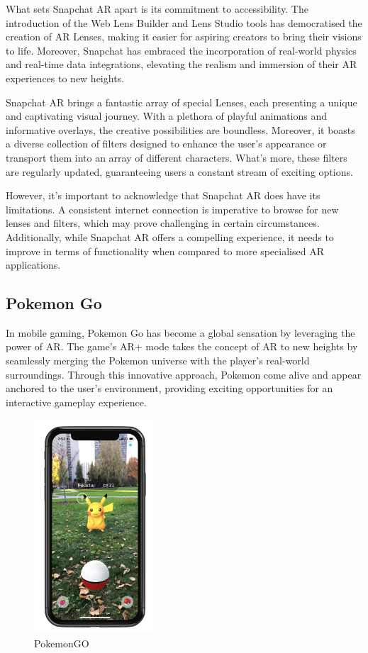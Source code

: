 What sets Snapchat \ac{AR} apart is its commitment to accessibility. The introduction of the Web Lens Builder and Lens Studio tools has democratised the creation of \ac{AR} Lenses, making it easier for aspiring creators to bring their visions to life. Moreover, Snapchat has embraced the incorporation of real-world physics and real-time data integrations, elevating the realism and immersion of their \ac{AR} experiences to new heights.

Snapchat AR brings a fantastic array of special Lenses, each presenting a unique and captivating visual journey. With a plethora of playful animations and informative overlays, the creative possibilities are boundless. Moreover, it boasts a diverse collection of filters designed to enhance the user's appearance or transport them into an array of different characters. What's more, these filters are regularly updated, guaranteeing users a constant stream of exciting options.

However, it's important to acknowledge that Snapchat AR does have its limitations. A consistent internet connection is imperative to browse for new lenses and filters, which may prove challenging in certain circumstances. Additionally, while Snapchat \ac{AR} offers a compelling experience, it needs to improve in terms of functionality when compared to more specialised \ac{AR} applications.



\subsection*{Pokemon Go}
In mobile gaming, Pokemon Go has become a global sensation by leveraging the power of \ac{AR}. The game's \ac{AR}+\cite{AR+} mode takes the concept of \ac{AR} to new heights by seamlessly merging the Pokemon universe with the player's real-world surroundings. Through this innovative approach, Pokemon come alive and appear anchored to the user's environment, providing exciting opportunities for an interactive gameplay experience.


\begin{figure}
    \centering
    \includegraphics[width=0.4\textwidth]{img/related-apps/PokemonGO.png}
    \caption{PokemonGO}
    \label{fig:PokemonGO}
\end{figure}

